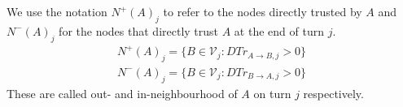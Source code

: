 \begin{definition}[Neighbourhood]
  \label{neighbourhood}
  We use the notation $N^{+}\left(A\right)_j$ to refer to the nodes directly trusted by $A$ and $N^{-}\left(A\right)_j$ for
  the nodes that directly trust $A$ at the end of turn $j$.
    \begin{equation}
    \begin{gathered}
      N^{+}\left(A\right)_j = \{B \in \mathcal{V}_j : DTr_{A \rightarrow B, j} > 0\} \\
      N^{-}\left(A\right)_j = \{B \in \mathcal{V}_j : DTr_{B \rightarrow A, j} > 0\}
    \end{gathered}
    \end{equation}
    These are called out- and in-neighbourhood of $A$ on turn $j$ respectively.
\end{definition}
